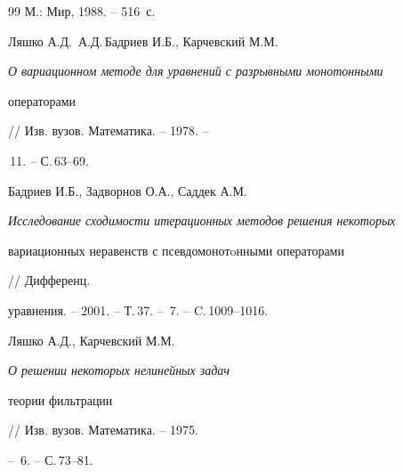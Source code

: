 \begin{thebibliography}{99}
М.: Мир, 1988. -- 516~с.







Ляшко А.Д.\, А.Д.\,Бадриев И.Б., Карчевский М.М.


{\em О вариационном методе для уравнений с разрывными монотонными 


операторами} // Изв. вузов. Математика. -- 1978. --


\No\,11. -- С.\,63--69.







Бадриев И.Б., Задворнов О.А., Саддек А.М. 


{\em Исследование сходимости итерационных методов решения некоторых 


вариационных неравенств с псевдомонотoнными операторами} // Дифференц. 


уравнения. -- 2001. -- Т.\,37. -- \No\,7. -- C.\,1009--1016.










Ляшко А.Д., Карчевский М.М.


{\em О решении некоторых нелинейных задач 


теории фильтрации} // Изв. вузов. Математика. -- 1975.


-- \No\,6. -- С.\,73--81. 





\end{thebibliography}





\vskip 2cm












\label{end}








